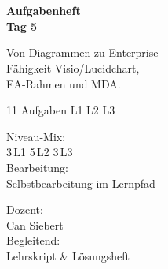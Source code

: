 \documentclass[11pt,a4paper,oneside]{article}
\begin{document}
\begin{titlepage}
  \pagestyle{empty}
  \vspace*{1.5cm}
  \\[2pt]
  \noindent{\color{lpAccent}\rule{\linewidth}{1.2pt}}\\[4pt]

  \vspace{3cm}
  {\sffamily\fontsize{30}{34}\selectfont\bfseries\color{lpInk}Aufgabenheft\\Tag 5\par}

  \vspace{0.7cm}
  {\sffamily\large\color{lpGray}Von Diagrammen zu Enterprise-\\F\"ahigkeit \textendash{} Visio/Lucidchart,\\EA-Rahmen und MDA.\par}

  \vspace{1.5cm}
  {\caveatfont\LARGE\color{lpAmber}11 Aufgaben \textperiodcentered{} L1 \textperiodcentered{} L2 \textperiodcentered{} L3}\par

  \vfill

  \noindent\begin{minipage}{0.55\linewidth}
    {\sffamily\footnotesize\color{lpGray}Niveau-Mix:}\\
    {\sffamily\small\color{lpInk}3\,\textsf{L1} \textperiodcentered{} 5\,\textsf{L2} \textperiodcentered{} 3\,\textsf{L3}}\\[10pt]
    {\sffamily\footnotesize\color{lpGray}Bearbeitung:}\\
    {\sffamily\small\color{lpInk}Selbstbearbeitung im Lernpfad}
  \end{minipage}\hfill
  \begin{minipage}{0.4\linewidth}
    \raggedleft
    {\sffamily\footnotesize\color{lpGray}Dozent:}\\
    {\sffamily\small\color{lpInk}Can Siebert}\\[10pt]
    {\sffamily\footnotesize\color{lpGray}Begleitend:}\\
    {\sffamily\small\color{lpInk}Lehrskript \& L\"osungsheft}
  \end{minipage}

  \vspace{0.5cm}
  \noindent{\color{lpAccent}\rule{\linewidth}{0.6pt}}
\end{titlepage}
\end{document}
